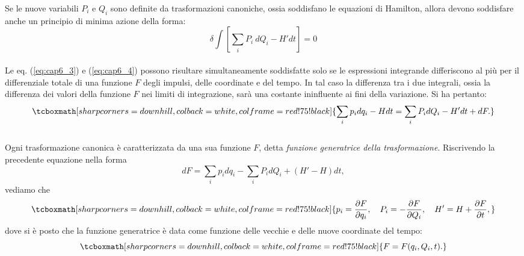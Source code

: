 Se le nuove variabili $P_i$ e $Q_i$ sono definite da trasformazioni canoniche, ossia soddisfano le equazioni di Hamilton, allora devono soddisfare anche un principio di minima azione della forma:
	\begin{equation}
		\delta \int \left[ \sum_i P_i\ dQ_i - H'dt\right] = 0
		\label{eq:cap6_4}
	\end{equation}\\
	
Le eq. (\ref{eq:cap6_3}) e (\ref{eq:cap6_4}) possono risultare simultaneamente soddisfatte solo se le espressioni integrande differiscono al pi\`u per il differenziale totale di una funzione $F$ degli impulsi, delle coordinate e del tempo. In tal caso la differenza tra i due integrali, ossia la differenza dei valori della funzione $F$ nei limiti di integrazione, sar\`a una costante ininfluente ai fini della variazione. Si ha pertanto:
	\begin{equation}
		\tcboxmath[sharp corners=downhill ,colback=white,colframe=red!75!black]{
			\sum_i p_i dq_i - Hdt = \sum_i P_i d Q_i - H'dt + dF .
			}
	\end{equation}\\
	
Ogni trasformazione canonica \`e caratterizzata da una sua funzione $F$, detta \textit{funzione generatrice della trasformazione}. Riscrivendo la precedente equazione nella forma
	\begin{equation}
		dF = \sum_i p_i d q_i - \sum_i P_i dQ_i + (H'-H)dt ,
		\label{eq:cap6_5}
	\end{equation}
vediamo che
	\begin{equation}
		\tcboxmath[sharp corners=downhill ,colback=white,colframe=red!75!black]{
			p_i = \frac{\partial F}{\partial q_i} , \quad P_i = - \frac{\partial F}{\partial Q_i} , \quad H' = H + \frac{\partial F}{\partial t} ,
			}
		\label{o}
	\end{equation}
dove si \`e posto che la funzione generatrice \`e data come funzione delle vecchie e delle nuove coordinate del tempo:
	\begin{equation}
		\tcboxmath[sharp corners=downhill ,colback=white,colframe=red!75!black]{
			F = F(q_i, Q_i,t) .
			}
	\end{equation}\\
	
